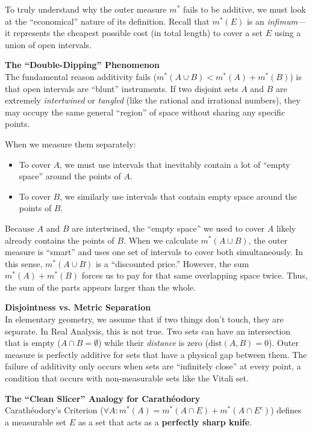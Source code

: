 \documentclass[../main.tex]{subfiles}
\begin{document}
\begin{remark}
	To truly understand why the outer measure $m^*$ fails to be additive, we must look at the ``economical'' nature of its definition. Recall that $m^*(E)$ is an \textit{infimum}—it represents the cheapest possible cost (in total length) to cover a set $E$ using a union of open intervals.

	\vspace{1em}
	\noindent \textbf{The ``Double-Dipping'' Phenomenon} \\
	The fundamental reason additivity fails ($m^*(A \cup B) < m^*(A) + m^*(B)$) is that open intervals are ``blunt'' instruments. If two disjoint sets $A$ and $B$ are extremely \textit{intertwined} or \textit{tangled} (like the rational and irrational numbers), they may occupy the same general ``region'' of space without sharing any specific points.
	
	When we measure them separately:
	\begin{itemize}
		\item To cover $A$, we must use intervals that inevitably contain a lot of ``empty space'' around the points of $A$.
		\item To cover $B$, we similarly use intervals that contain empty space around the points of $B$.
	\end{itemize}
	Because $A$ and $B$ are intertwined, the ``empty space'' we used to cover $A$ likely already contains the points of $B$. When we calculate $m^*(A \cup B)$, the outer measure is ``smart'' and uses one set of intervals to cover both simultaneously. In this sense, $m^*(A \cup B)$ is a ``discounted price.'' However, the sum $m^*(A) + m^*(B)$ forces us to pay for that same overlapping space twice. Thus, the sum of the parts appears larger than the whole.

	\vspace{1em}
	\noindent \textbf{Disjointness vs. Metric Separation} \\
	In elementary geometry, we assume that if two things don't touch, they are separate. In Real Analysis, this is not true. Two sets can have an intersection that is empty ($A \cap B = \emptyset$) while their \textit{distance} is zero ($\text{dist}(A,B) = 0$). Outer measure is perfectly additive for sets that have a physical gap between them. The failure of additivity only occurs when sets are ``infinitely close'' at every point, a condition that occurs with non-measurable sets like the Vitali set.

	\vspace{1em}
	\noindent \textbf{The ``Clean Slicer'' Analogy for Carathéodory} \\
	Carathéodory’s Criterion ($\forall A: m^*(A) = m^*(A \cap E) + m^*(A \cap E^c)$) defines a measurable set $E$ as a set that acts as a \textbf{perfectly sharp knife}.
	

\end{remark}
\end{document}
